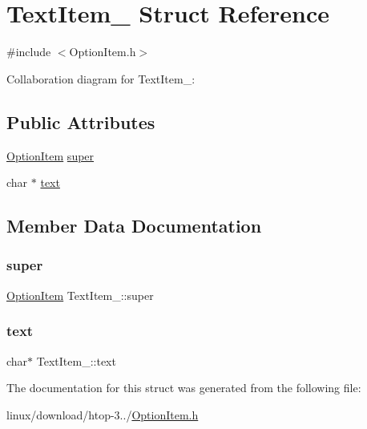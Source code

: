 \hypertarget{structTextItem__}{}\section{Text\+Item\+\_\+ Struct Reference}
\label{structTextItem__}


{\ttfamily \#include $<$Option\+Item.\+h$>$}



Collaboration diagram for Text\+Item\+\_\+\+:
\subsection*{Public Attributes}
\begin{DoxyCompactItemize}
\item 
\hyperlink{OptionItem_8h_ae801b448d89e9564273432c06d91b784}{Option\+Item} \hyperlink{structTextItem___a19069fe9d8ba1efb4740f071f9d32aa2}{super}
\item 
char $\ast$ \hyperlink{structTextItem___ad38a424792c2a060c8543337de2551a3}{text}
\end{DoxyCompactItemize}


\subsection{Member Data Documentation}
\mbox{\label{structTextItem___a19069fe9d8ba1efb4740f071f9d32aa2}} 
\subsubsection{\texorpdfstring{super}{super}}
{\footnotesize\ttfamily \hyperlink{OptionItem_8h_ae801b448d89e9564273432c06d91b784}{Option\+Item} Text\+Item\+\_\+\+::super}

\mbox{\label{structTextItem___ad38a424792c2a060c8543337de2551a3}} 
\subsubsection{\texorpdfstring{text}{text}}
{\footnotesize\ttfamily char$\ast$ Text\+Item\+\_\+\+::text}



The documentation for this struct was generated from the following file\+:\begin{DoxyCompactItemize}
\item 
linux/download/htop-\/3../\hyperlink{OptionItem_8h}{Option\+Item.\+h}\end{DoxyCompactItemize}
